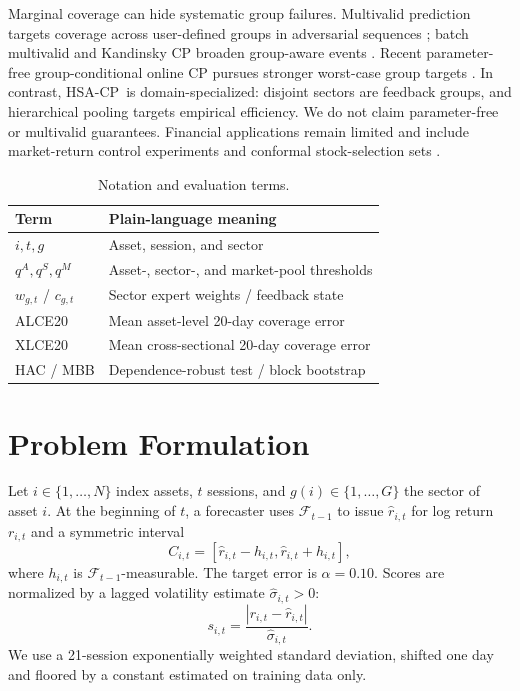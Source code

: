 \documentclass[conference]{IEEEtran}
\newcommand{\method}{HSA-CP}
\begin{document}
Marginal coverage can hide systematic group failures. Multivalid prediction targets coverage across user-defined groups in adversarial sequences \cite{bastani2022mvp}; batch multivalid and Kandinsky CP broaden group-aware events \cite{jung2022batch,bairaktari2025kandinsky}. Recent parameter-free group-conditional online CP pursues stronger worst-case group targets \cite{bharti2026group}. In contrast, \method\ is domain-specialized: disjoint sectors are feedback groups, and hierarchical pooling targets empirical efficiency. We do not claim parameter-free or multivalid guarantees. Financial applications remain limited and include market-return control experiments and conformal stock-selection sets \cite{angelopoulos2023pid,kaya2025stocks}.

\begin{table}[t]
\centering
\caption{Notation and evaluation terms.}
\label{tab:notation}
\scriptsize
\setlength{\tabcolsep}{3.0pt}
\begin{tabular}{ll}
\toprule
Term & Plain-language meaning\\
\midrule
$i,t,g$ & Asset, session, and sector\\
$q^A,q^S,q^M$ & Asset-, sector-, and market-pool thresholds\\
$w_{g,t}$ / $c_{g,t}$ & Sector expert weights / feedback state\\
ALCE20 & Mean asset-level 20-day coverage error\\
XLCE20 & Mean cross-sectional 20-day coverage error\\
HAC / MBB & Dependence-robust test / block bootstrap\\
\bottomrule
\end{tabular}
\end{table}

\section{Problem Formulation}

Let $i\in\{1,\ldots,N\}$ index assets, $t$ sessions, and $g(i)\in\{1,\ldots,G\}$ the sector of asset $i$. At the beginning of $t$, a forecaster uses $\mathcal F_{t-1}$ to issue $\widehat r_{i,t}$ for log return $r_{i,t}$ and a symmetric interval
\begin{equation}
 C_{i,t}=[\widehat r_{i,t}-h_{i,t},\widehat r_{i,t}+h_{i,t}],
\end{equation}
where $h_{i,t}$ is $\mathcal F_{t-1}$-measurable. The target error is $\alpha=0.10$. Scores are normalized by a lagged volatility estimate $\widehat\sigma_{i,t}>0$:
\begin{equation}
 s_{i,t}=\frac{|r_{i,t}-\widehat r_{i,t}|}{\widehat\sigma_{i,t}}.
 \label{eq:score}
\end{equation}
We use a 21-session exponentially weighted standard deviation, shifted one day and floored by a constant estimated on training data only.
\end{document}
